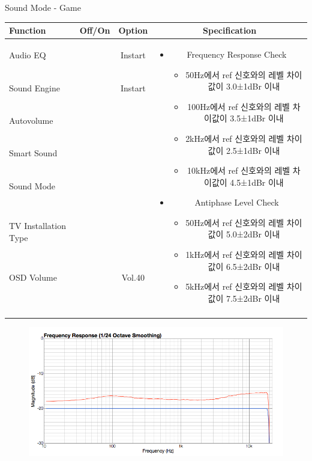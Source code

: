 \begin{frame}[t]{Sound Mode - Game}
\begin{tiny}
\begin{tabular}{@{}lccc@{}}
\toprule
Function & Off/On & Option & Specification \\
\midrule
Audio EQ & \color{black}{Off} & Instart &
\multirow{10}{60mm}{
\begin{itemize}
\item Frequency Response Check
	\begin{itemize}
	\item 50Hz에서 ref 신호와의 레벨 차이값이 3.0±1dBr 이내
	\item 100Hz에서 ref 신호와의 레벨 차이값이 3.5±1dBr 이내
	\item 2kHz에서 ref 신호와의 레벨 차이값이 2.5±1dBr 이내
	\item 10kHz에서 ref 신호와의 레벨 차이값이 4.5±1dBr 이내
	\end{itemize}
\item Antiphase Level Check
	\begin{itemize}
	\item 50Hz에서 ref 신호와의 레벨 차이값이 5.0±2dBr 이내
	\item 1kHz에서 ref 신호와의 레벨 차이값이 6.5±2dBr 이내
	\item 5kHz에서 ref 신호와의 레벨 차이값이 7.5±2dBr 이내
	\end{itemize}
\end{itemize}
} \\
Sound Engine & \color{blue}{On} & Instart & \\
Autovolume & \color{black}{Off} & & \\
Smart Sound & \color{black}{Off} & & \\
Sound Mode & \color{blue}{On} & \color{blue}{Game} & \\
TV Installation Type & \color{blue}{On} & \color{black}{Standtype1} & \\
OSD Volume & \color{blue}{On} & Vol.40 & \\
& & & \\
& & & \\
& & & \\
& & & \\
\midrule
\end{tabular}
\end{tiny}

\begin{figure}[b]
\includegraphics[height=0.3\textwidth]{figures/game.png}
\end{figure}

\end{frame}
